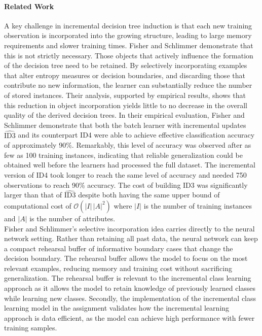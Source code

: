 \documentclass[conference]{IEEEtran}
\begin{document}
\paragraph{Related Work}
A key challenge in incremental decision tree induction is that each new training observation is incorporated into the growing structure, leading to
 large memory requirements and slower training times. Fisher and Schlimmer \cite{fisher1986} demonstrate that this is not strictly necessary. Those 
 objects that actively influence the formation of the decision tree need to be retained. By selectively incorporating examples that alter entropy measures or 
 decision boundaries, and discarding those that contribute no new information, the learner can substantially reduce the number of stored instances. Their 
 analysis, supported by empirical results, shows that this reduction in object incorporation yields little to no decrease in the overall quality of 
 the derived decision trees. In their empirical evaluation, Fisher and Schlimmer demonstrate that both the batch learner with incremental 
 updates \(\widehat{\mathrm{ID3}}\) and its counterpart ID4 were able to achieve effective classification accuracy of approximately 90\%. Remarkably, 
 this level of accuracy was observed after as few as 100 training instances, 
 indicating that reliable generalization could be obtained well before the learners had processed the full dataset. The incremental version of
 ID4 took longer to reach the same level of accuracy and needed 750 observations to reach 90\% accuracy. The cost of building 
 ID3 was significantly larger than that of \(\widehat{\mathrm{ID3}}\) despite both having the same upper bound of computational cost of 
  $\mathcal{O}(|I|\,|A|^2)$ where \(|I|\) is the number of training instances and \(|A|\) is the number of attributes.\\

Fisher and Schlimmer's selective incorporation idea carries directly to the neural network setting. Rather than 
retaining all past data, the neural network can keep a compact rehearsal buffer of informative boundary cases that change the decision boundary. The rehearsal buffer allows the model to focus on the most relevant examples, reducing memory and training cost without sacrificing generalization. 
The rehearsal buffer is relevant to the incremental class learning approach as it allows the model to retain knowledge of previously learned classes while learning new classes. 
Secondly, the implementation of the incremental class learning model in the assignment validates how the incremental learning 
approach is data efficient, as the model can achieve high performance with fewer training samples.
\end{document}
